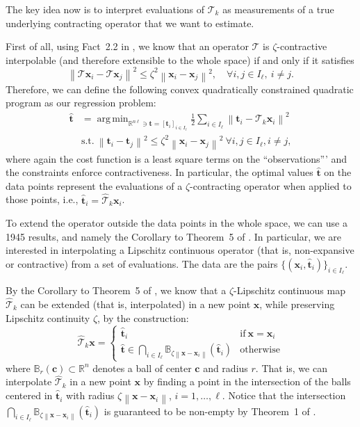 \documentclass{article}
\DeclareMathOperator*{\argmin}{arg\,min}
\newcommand{\norm}[1]{\left\lVert#1\right\rVert}
\newcommand{\R}{\mathbb{R}}
\newcommand{\tv}{\mathbold{t}}
\newcommand{\x}{\mathbold{x}}
\newcommand{\ball}[2]{\mathbb{B}_{#2}(#1)}
\newcommand{\cv}{\mathbold{c}}
\newcommand{\T}{\mathcal{T}}
\begin{document}
The key idea now is to interpret evaluations of $\T_k$ as measurements of a true underlying contracting operator that we want to estimate. 
 

First of all, using Fact~2.2 in \cite{ryu_operator_2020}, we know that an operator $\T$ is $\zeta$-contractive interpolable (and therefore extensible to the whole space) if and only if it satisfies
\begin{equation}
	\norm{\T \x_i - \T \x_j}^2 \leq \zeta^2 \norm{\x_i - \x_j}^2, \quad \forall i,j \in I_{\ell}, \ i \neq j.
\end{equation}
Therefore, we can define the following convex quadratically constrained quadratic program as our regression problem:
\begin{equation}\label{eq:operator-regression}
\begin{split}
	\hat{\tv} &= \argmin_{ \R^{n\ell} \ni \tv = [\tv_i]_{i \in I_{\ell}}} \frac{1}{2} \sum_{i \in I_{\ell}} \norm{\tv_i - \T_k \x_i}^2 \\
	&\text{s.t.} \ \norm{\tv_i - \tv_j}^2 \leq \zeta^2 \norm{\x_i - \x_j}^2 \ \forall i,j \in I_{\ell}, i \neq j,
\end{split}
\end{equation}
where again the cost function is a least square terms on the ``observations''' and the constraints enforce contractiveness. In particular, the optimal values $\hat{\tv}$ on the data points represent the evaluations of a $\zeta$-contracting operator when applied to those points, i.e., $\hat{\tv}_i = \hat{\T}_k\x_i$.  

To extend the operator outside the data points in the whole space, we can use a 1945 results, and namely the Corollary to Theorem~5 of \cite{valentine_lipschitz_1945}. In particular, we are interested in interpolating a Lipschitz continuous operator (that is, non-expansive or contractive) from a set of evaluations. The data are the pairs $\{ (\x_i, \hat{\tv}_i) \}_{i \in I_{\ell}}$.

By the Corollary to Theorem~5 of \cite{valentine_lipschitz_1945}, we know that a $\zeta$-Lipschitz continuous map $\hat{\T}_k$ can be extended (that is, interpolated) in a new point $\x$, while preserving Lipschitz continuity $\zeta$, by the construction:
\begin{equation}\label{eq:interpolation}
	\hat{\T}_k \x = \begin{cases}
		\hat{\tv}_i & \text{if} \ \x = \x_i \\
		\hat{\tv} \in \bigcap_{i \in I_{\ell}} \ball{\hat{\tv}_i}{\zeta \norm{\x - \x_i}} & \text{otherwise}
	\end{cases}
\end{equation}
where $\ball{\cv}{r} \subset \R^n$ denotes a ball of center $\cv$ and radius $r$. That is, we can interpolate $\hat{\T}_k$ in a new point $\x$ by finding a point in the intersection of the balls centered in $\hat{\tv}_i$ with radius $\zeta \norm{\x - \x_i}$, $i = 1, \ldots, \ell$. Notice that the intersection $\bigcap_{i \in I_{\ell}} \ball{\hat{\tv}_i}{\zeta \norm{\x - \x_i}}$ is guaranteed to be non-empty by Theorem~1 of \cite{valentine_lipschitz_1945}.
\end{document}
